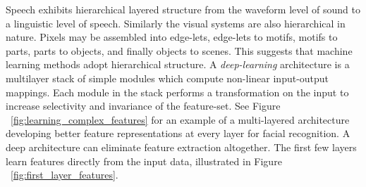 Speech exhibits hierarchical layered structure from the waveform level of sound to a linguistic level of speech\citep{baker2009variability}.
Similarly the visual systems are also hierarchical in nature.
Pixels may be assembled into edge-lets, edge-lets to motifs, motifs to parts, parts to objects, and finally objects to scenes\citep{lecun2010convolutional}.
This suggests that machine learning methods adopt hierarchical structure.
A \textit{deep-learning} architecture is a multilayer stack of simple modules which compute non-linear input-output mappings.
Each module in the stack performs a transformation on the input to increase selectivity and invariance of the feature-set.
See Figure ~\ref{fig:learning_complex_features} for an example of a multi-layered architecture developing better feature representations at every layer for facial recognition.
A deep architecture can eliminate feature extraction altogether\citep{lecun1995convolutional}.
The first few layers learn features directly from the input data, illustrated in Figure ~\ref{fig:first_layer_features}.
